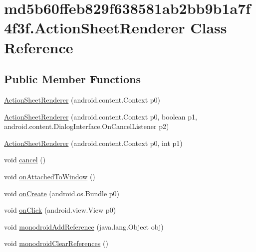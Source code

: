 \hypertarget{classmd5b60ffeb829f638581ab2bb9b1a7f4f3f_1_1_action_sheet_renderer}{
\section{md5b60ffeb829f638581ab2bb9b1a7f4f3f.ActionSheetRenderer Class Reference}
\label{classmd5b60ffeb829f638581ab2bb9b1a7f4f3f_1_1_action_sheet_renderer}
}
\subsection*{Public Member Functions}
\begin{CompactItemize}
\item 
\hyperlink{classmd5b60ffeb829f638581ab2bb9b1a7f4f3f_1_1_action_sheet_renderer_477e90d5625841d42397451016a2083b}{ActionSheetRenderer} (android.content.Context p0)
\item 
\hyperlink{classmd5b60ffeb829f638581ab2bb9b1a7f4f3f_1_1_action_sheet_renderer_b6aa8d42c990fdb799b5266e29e12ec1}{ActionSheetRenderer} (android.content.Context p0, boolean p1, android.content.DialogInterface.OnCancelListener p2)
\item 
\hyperlink{classmd5b60ffeb829f638581ab2bb9b1a7f4f3f_1_1_action_sheet_renderer_1706d5f3027c6a9bbc7391f82ab29e8a}{ActionSheetRenderer} (android.content.Context p0, int p1)
\item 
void \hyperlink{classmd5b60ffeb829f638581ab2bb9b1a7f4f3f_1_1_action_sheet_renderer_213358af9f3f2aee0abeeae66788d604}{cancel} ()
\item 
void \hyperlink{classmd5b60ffeb829f638581ab2bb9b1a7f4f3f_1_1_action_sheet_renderer_13de0c252c4cc2e9e3f02887c8673f47}{onAttachedToWindow} ()
\item 
void \hyperlink{classmd5b60ffeb829f638581ab2bb9b1a7f4f3f_1_1_action_sheet_renderer_4bcaeebda1585db4eb18c4353482bf5e}{onCreate} (android.os.Bundle p0)
\item 
void \hyperlink{classmd5b60ffeb829f638581ab2bb9b1a7f4f3f_1_1_action_sheet_renderer_5df38c7adc6079f99eaf47b19cbb7974}{onClick} (android.view.View p0)
\item 
void \hyperlink{classmd5b60ffeb829f638581ab2bb9b1a7f4f3f_1_1_action_sheet_renderer_f8ffa136f84a4104367ca2047aad806b}{monodroidAddReference} (java.lang.Object obj)
\item 
void \hyperlink{classmd5b60ffeb829f638581ab2bb9b1a7f4f3f_1_1_action_sheet_renderer_2cba29a93ba3c95ecdf5198281ec137c}{monodroidClearReferences} ()
\end{CompactItemize}

